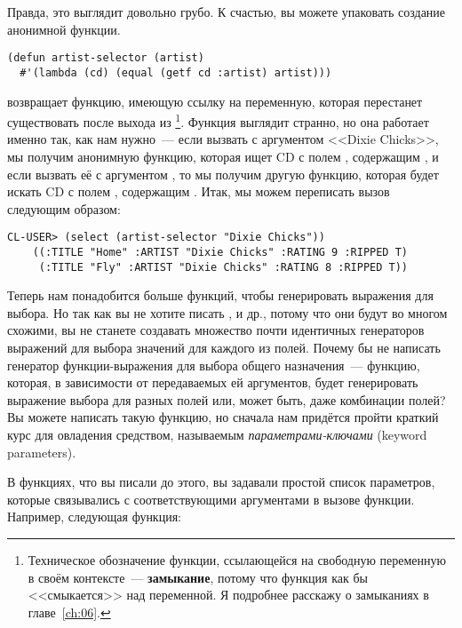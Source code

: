 Правда, это выглядит довольно грубо. К счастью, вы можете упаковать создание анонимной функции.

\begin{lstlisting}
(defun artist-selector (artist)
  #'(lambda (cd) (equal (getf cd :artist) artist)))
\end{lstlisting}

 возвращает функцию, имеющую ссылку на переменную, которая
перестанет существовать после выхода из \footnote{Техническое
  обозначение функции, ссылающейся на свободную переменную в своём контексте~---
  \textbf{замыкание}, потому что функция как бы <<смыкается>> над переменной. Я подробнее
  расскажу о замыканиях в главе~\ref{ch:06}.}. Функция выглядит странно, но она работает именно так,
как нам нужно~--- если вызвать  с аргументом <<Dixie Chicks>>, мы
получим анонимную функцию, которая ищет CD с полем , содержащим , и если вызвать её с аргументом , то мы получим другую функцию,
которая будет искать CD с полем , содержащим . Итак, мы можем
переписать вызов  следующим образом:

\begin{lstlisting}[style=lisprepl]
  CL-USER> (select (artist-selector "Dixie Chicks"))
    ((:TITLE "Home" :ARTIST "Dixie Chicks" :RATING 9 :RIPPED T)
     (:TITLE "Fly" :ARTIST "Dixie Chicks" :RATING 8 :RIPPED T))
\end{lstlisting}

Теперь нам понадобится больше функций, чтобы генерировать выражения для выбора. Но так как
вы не хотите писать ,  и др., потому что они
будут во многом схожими, вы не станете создавать множество почти идентичных генераторов
выражений для выбора значений для каждого из полей. Почему бы не написать генератор
функции-выражения для выбора общего назначения~--- функцию, которая, в зависимости от
передаваемых ей аргументов, будет генерировать выражение выбора для разных полей или,
может быть, даже комбинации полей? Вы можете написать такую функцию, но сначала нам
придётся пройти краткий курс для овладения средством, называемым
\textit{параметрами-ключами} (keyword parameters).

В функциях, что вы писали до этого, вы задавали простой список параметров, которые
связывались с соответствующими аргументами в вызове функции. Например, следующая функция:

